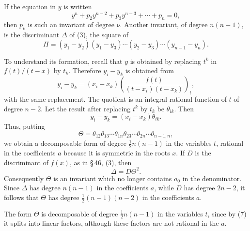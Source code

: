 \documentclass[11pt]{article}
\begin{document}
If the equation in $y$ is written
\begin{equation}
 y^n+p_2y^{n-2}+p_3y^{n-3}+\cdots+p_n=0,
\tag{3}
\end{equation}
then $p_\nu$ is such an invariant of degree $\nu$. Another invariant, of degree $n(n-1)$, is the discriminant $\Delta$ of (3), the square of
\begin{equation}
 \Pi=(y_1-y_2)(y_1-y_3)\cdots(y_2-y_3)\cdots(y_{n-1}-y_n).
\tag{4}
\end{equation}

To understand its formation, recall that $y$ is obtained by replacing $t^k$ in $f(t)/(t-x)$ by $t_k$. Therefore $y_i-y_k$ is obtained from
\begin{equation}
 y_i-y_k=(x_i-x_k)\left(\frac{f(t)}{(t-x_i)(t-x_k)}\right)_t,
\tag{5}
\end{equation}
with the same replacement. The quotient is an integral rational function of $t$ of degree $n-2$. Let the result after replacing $t^k$ by $t_k$ be $\theta_{ik}$. Then
\begin{equation}
 y_i-y_k=(x_i-x_k)\theta_{ik}.
\tag{6}
\end{equation}
Thus, putting
\begin{equation}
 \Theta=\theta_{12}\theta_{13}\cdots\theta_{1n}\theta_{23}\cdots\theta_{2n}\cdots\theta_{n-1,n},
\tag{7}
\end{equation}
we obtain a decomposable form of degree $\frac12n(n-1)$ in the variables $t$, rational in the coefficients $a$ because it is symmetric in the roots $x$. If $D$ is the discriminant of $f(x)$, as in \S\,46, (3), then
\begin{equation}
 \Delta=D\Theta^2.
\tag{8}
\end{equation}
Consequently $\Theta$ is an invariant which no longer contains $a_0$ in the denominator. Since $\Delta$ has degree $n(n-1)$ in the coefficients $a$, while $D$ has degree $2n-2$, it follows that $\Theta$ has degree $\frac12(n-1)(n-2)$ in the coefficients $a$.

The form $\Theta$ is decomposable of degree $\frac12n(n-1)$ in the variables $t$, since by (7) it splits into linear factors, although these factors are not rational in the $a$.
\end{document}
